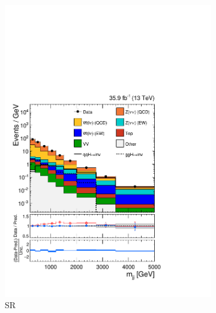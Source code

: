 \begin{figure}[]
    \begin{center}
        \begin{subfigure}[t]{0.32\textwidth}
            \includegraphics[width=\textwidth]{figures/vbf/fits/vbf_PULLS_prefit_postfit_signal.pdf}
            \caption{SR}
        \end{subfigure}
        \begin{subfigure}[t]{0.32\textwidth}

\end{subfigure}
\end{center}
\end{figure}
